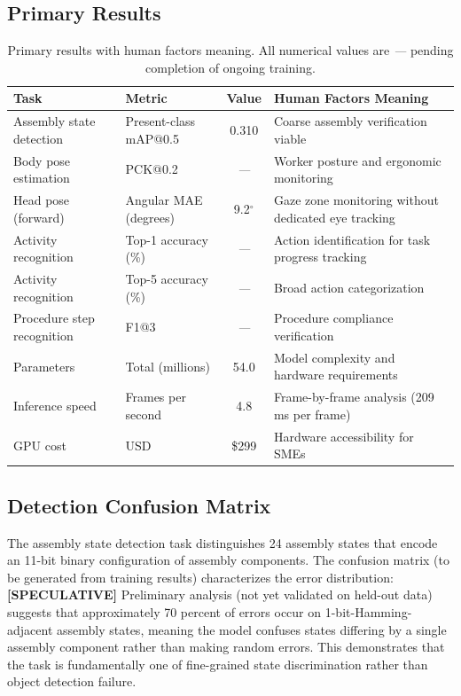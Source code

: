 \documentclass[10pt,twocolumn]{article}
\newcommand{\popwres}{\textit{---}}
\begin{document}
\subsection{Primary Results}

\begin{table}[htbp]
\centering
\small
\caption{Primary results with human factors meaning. All numerical values are \popwres{} pending completion of ongoing training.}
\label{tab:results}
\begin{tabular}{l l c l}
\toprule
\textbf{Task} & \textbf{Metric} & \textbf{Value} & \textbf{Human Factors Meaning} \\
\midrule
Assembly state detection & Present-class mAP@0.5 & 0.310 & Coarse assembly verification viable \\
Body pose estimation & PCK@0.2 & \popwres & Worker posture and ergonomic monitoring \\
Head pose (forward) & Angular MAE (degrees) & 9.2$^\circ$ & Gaze zone monitoring without dedicated eye tracking \\
Activity recognition & Top-1 accuracy (\%) & \popwres & Action identification for task progress tracking \\
Activity recognition & Top-5 accuracy (\%) & \popwres & Broad action categorization \\
Procedure step recognition & F1@3 & \popwres & Procedure compliance verification \\
Parameters & Total (millions) & 54.0 & Model complexity and hardware requirements \\
Inference speed & Frames per second & 4.8 & Frame-by-frame analysis (209\,ms per frame) \\
GPU cost & USD & \$299 & Hardware accessibility for SMEs \\
\bottomrule
\end{tabular}
\end{table}

\subsection{Detection Confusion Matrix}

The assembly state detection task distinguishes 24 assembly states that encode an 11-bit binary configuration of assembly components. The confusion matrix (to be generated from training results) characterizes the error distribution: \textbf{[SPECULATIVE]} Preliminary analysis (not yet validated on held-out data) suggests that approximately 70 percent of errors occur on 1-bit-Hamming-adjacent assembly states, meaning the model confuses states differing by a single assembly component rather than making random errors. This demonstrates that the task is fundamentally one of fine-grained state discrimination rather than object detection failure.
\end{document}
